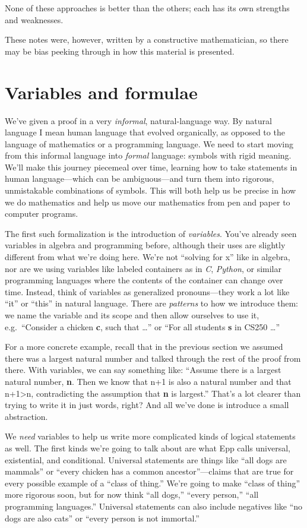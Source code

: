 \documentclass[11pt]{article}
\begin{document}
None of these approaches is better than the others; each has its own strengths and weaknesses.

These notes were, however, written by a constructive mathematician, so there may be bias peeking through in how this material is presented.

\section{Variables and formulae}
We've given a proof in a very \emph{informal}, natural-language way. By natural language I mean human language that evolved organically, as opposed to the language of mathematics or a programming language. We need to start moving from this informal language into \emph{formal} language: symbols with rigid meaning. We'll make this journey piecemeal over time, learning how to take statements in human language---which can be ambiguous---and turn them into rigorous, unmistakable combinations of symbols. This will both help us be precise in how we do mathematics and help us move our mathematics from pen and paper to computer programs.

The first such formalization is the introduction of \emph{variables}. You've already seen variables in algebra and programming before, although their uses are slightly different from what we're doing here. We're not ``solving for x'' like in algebra, nor are we using variables like labeled containers as in \emph{C}, \emph{Python}, or similar programming languages where the contents of the container can change over time. Instead, think of variables as generalized pronouns---they work a lot like ``it'' or ``this'' in natural language. There are \emph{patterns} to how we introduce them: we name the variable and its scope and then allow ourselves to use it, e.g.\ ``Consider a chicken \textbf{c}, such that \ldots'' or ``For all students \textbf{s} in CS250 \ldots''

For a more concrete example, recall that in the previous section we assumed there was a largest natural number and talked through the rest of the proof from there. With variables, we can say something like: ``Assume there is a largest natural number, \textbf{n}. Then we know that n+1 is also a natural number and that n+1>n, contradicting the assumption that \textbf{n} is largest.'' That's a lot clearer than trying to write it in just words, right? And all we've done is introduce a small abstraction.

We \emph{need} variables to help us write more complicated kinds of logical statements as well. The first kinds we're going to talk about are what Epp calls universal, existential, and conditional. Universal statements are things like ``all dogs are mammals'' or ``every chicken has a common ancestor''---claims that are true for every possible example of a ``class of thing.'' We're going to make ``class of thing'' more rigorous soon, but for now think ``all dogs,'' ``every person,'' ``all programming languages.'' Universal statements can also include negatives like ``no dogs are also cats'' or ``every person is not immortal.''
\end{document}
